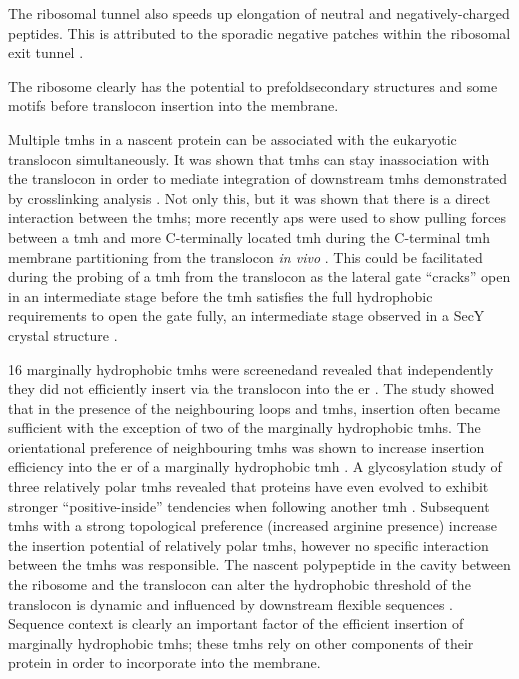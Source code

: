 The ribosomal tunnel also speeds up elongation of neutral and negatively-charged peptides.
This is attributed to the sporadic negative patches within the ribosomal exit tunnel \cite{Lu2008}.

The ribosome clearly has the potential to prefoldsecondary structures and some motifs before translocon insertion into the membrane.

Multiple \gls{tmh}s in a nascent protein can be associated with the eukaryotic translocon simultaneously.
It was shown that \gls{tmh}s can stay inassociation with the translocon in order to mediate integration of downstream \gls{tmh}s demonstrated by crosslinking analysis \cite{Sadlish2005, Cross2009}.
Not only this, but it was shown that there is a direct interaction between the \gls{tmh}s; more recently \gls{ap}s were used to show pulling forces between a \gls{tmh} and more C-terminally located \gls{tmh} during the C-terminal \gls{tmh} membrane partitioning from the translocon \textit{in vivo} \cite{Cymer2013}.
This could be facilitated during the probing of a \gls{tmh} from the translocon as the lateral gate ``cracks'' open in an intermediate stage before the \gls{tmh} satisfies the full hydrophobic requirements to open the gate fully, an intermediate stage observed in a SecY crystal structure \cite{Egea2010}.

16 marginally hydrophobic \gls{tmh}s were screenedand revealed that independently they did not efficiently insert via the translocon into the \gls{er} \cite{Hedin2009}.
The study showed that in the presence of the neighbouring loops and \gls{tmh}s, insertion often became sufficient with the exception of two of the marginally hydrophobic \gls{tmh}s.
The orientational preference of neighbouring \gls{tmh}s was shown to increase insertion efficiency into the \gls{er} of a marginally hydrophobic \gls{tmh} \cite{Öjemalm2012}.
A glycosylation study of three relatively polar \gls{tmh}s revealed that proteins have even evolved to exhibit stronger ``positive\--inside'' tendencies when following another \gls{tmh} \cite{Virkki2014}.
Subsequent \gls{tmh}s with a strong topological preference (increased arginine presence) increase the insertion potential of relatively polar \gls{tmh}s, however no specific interaction between the \gls{tmh}s was responsible.
The nascent polypeptide in the cavity between the ribosome and the translocon can
alter the hydrophobic threshold of the translocon is dynamic and influenced by downstream flexible sequences \cite{Junne2017}.
Sequence context is clearly an important factor of the efficient insertion of marginally hydrophobic \gls{tmh}s; these \gls{tmh}s rely on other components of their protein in order to incorporate into the membrane.

